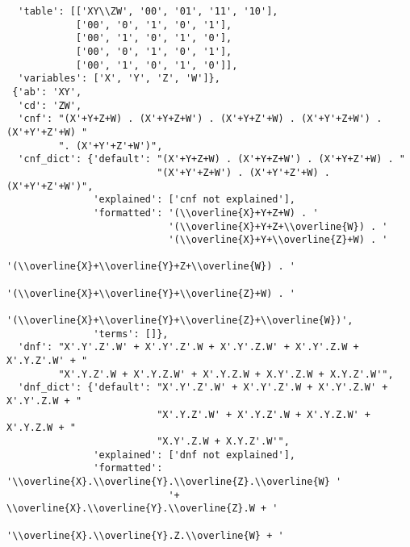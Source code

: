 \begin{verbatim}
  'table': [['XY\\ZW', '00', '01', '11', '10'],
            ['00', '0', '1', '0', '1'],
            ['00', '1', '0', '1', '0'],
            ['00', '0', '1', '0', '1'],
            ['00', '1', '0', '1', '0']],
  'variables': ['X', 'Y', 'Z', 'W']},
 {'ab': 'XY',
  'cd': 'ZW',
  'cnf': "(X'+Y+Z+W) . (X'+Y+Z+W') . (X'+Y+Z'+W) . (X'+Y'+Z+W') . (X'+Y'+Z'+W) "
         ". (X'+Y'+Z'+W')",
  'cnf_dict': {'default': "(X'+Y+Z+W) . (X'+Y+Z+W') . (X'+Y+Z'+W) . "
                          "(X'+Y'+Z+W') . (X'+Y'+Z'+W) . (X'+Y'+Z'+W')",
               'explained': ['cnf not explained'],
               'formatted': '(\\overline{X}+Y+Z+W) . '
                            '(\\overline{X}+Y+Z+\\overline{W}) . '
                            '(\\overline{X}+Y+\\overline{Z}+W) . '
                            '(\\overline{X}+\\overline{Y}+Z+\\overline{W}) . '
                            '(\\overline{X}+\\overline{Y}+\\overline{Z}+W) . '
                            '(\\overline{X}+\\overline{Y}+\\overline{Z}+\\overline{W})',
               'terms': []},
  'dnf': "X'.Y'.Z'.W' + X'.Y'.Z'.W + X'.Y'.Z.W' + X'.Y'.Z.W + X'.Y.Z'.W' + "
         "X'.Y.Z'.W + X'.Y.Z.W' + X'.Y.Z.W + X.Y'.Z.W + X.Y.Z'.W'",
  'dnf_dict': {'default': "X'.Y'.Z'.W' + X'.Y'.Z'.W + X'.Y'.Z.W' + X'.Y'.Z.W + "
                          "X'.Y.Z'.W' + X'.Y.Z'.W + X'.Y.Z.W' + X'.Y.Z.W + "
                          "X.Y'.Z.W + X.Y.Z'.W'",
               'explained': ['dnf not explained'],
               'formatted': '\\overline{X}.\\overline{Y}.\\overline{Z}.\\overline{W} '
                            '+ \\overline{X}.\\overline{Y}.\\overline{Z}.W + '
                            '\\overline{X}.\\overline{Y}.Z.\\overline{W} + '

\end{verbatim}
